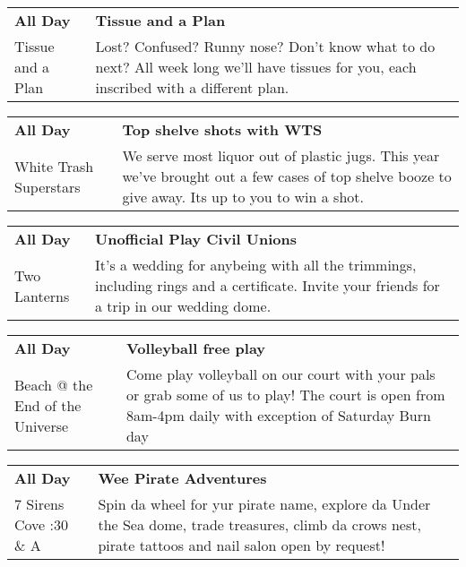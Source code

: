 \begin{tabular}{ p{1in} p{2.2in} }
    \textbf{All Day} & \textbf{Tissue and a Plan} \\
    Tissue and a Plan \newline  & Lost? Confused? Runny nose? Don't know what to do next? All week long we'll have tissues for you, each inscribed with a different plan. \\
    \hline 
\end{tabular}
    
\begin{tabular}{ p{1in} p{2.2in} }
    \textbf{All Day} & \textbf{Top shelve shots with WTS} \\
    White Trash Superstars \newline  & We serve most liquor out of plastic jugs. This year we've brought out a few cases of top shelve booze to give away. Its up to you to win a shot. \\
    \hline 
\end{tabular}
    
\begin{tabular}{ p{1in} p{2.2in} }
    \textbf{All Day} & \textbf{Unofficial Play Civil Unions} \\
    Two Lanterns \newline  & It's a wedding for anybeing with all the trimmings, including rings and a certificate.  Invite your friends for a trip in our wedding dome. \\
    \hline 
\end{tabular}
    
\begin{tabular}{ p{1in} p{2.2in} }
    \textbf{All Day} & \textbf{Volleyball free play } \\
    Beach @ the End of the Universe \newline  & Come play volleyball on our court with your pals or grab some of us to play! The court is open from 8am-4pm daily with exception of Saturday Burn day \\
    \hline 
\end{tabular}
    
\begin{tabular}{ p{1in} p{2.2in} }
    \textbf{All Day} & \textbf{Wee Pirate Adventures} \\
    7 Sirens Cove \newline 7:30 \& A & Spin da wheel for yur pirate name, explore da Under the Sea dome, trade treasures, climb da crows nest, pirate tattoos and nail salon open by request! \\
    \hline 
\end{tabular}
    
